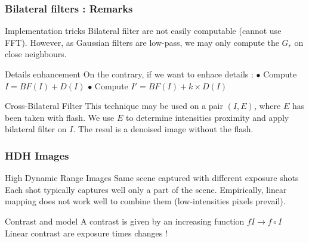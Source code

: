 \documentclass[pdf]{beamer}
\begin{document}
\begin{frame}
\frametitle{Bilateral filters : Remarks}


\begin{exampleblock}{Implementation tricks}
Bilateral filter are not easily computable (cannot use FFT).\newline
However, as Gaussian filters are low-pass, we may only compute the $G_r$ on close neighbours. 
\end{exampleblock}

\begin{exampleblock}{Details enhancement}
On the contrary, if we want to enhace details : \newline
$\bullet$ Compute $I = BF(I)+D(I)$ \newline
$\bullet$ Compute $I' = BF(I)+k \times D(I)$ \newline
\end{exampleblock}

\begin{exampleblock}{Cross-Bilateral Filter}
This technique may be used on a pair $(I,E)$, where $E$ has been taken with flash.\newline
We use $E$ to determine intensities proximity and apply bilateral filter on $I$.\newline
The resul is a denoised image without the flash.
\end{exampleblock}

\end{frame}

\begin{frame}
\frametitle{HDH Images}

\begin{block}{High Dynamic Range Images}
Same scene captured with different exposure shots\newline
Each shot typically captures well only a part of the scene. \newline
Empirically, linear mapping does not work well to combine them (low-intensities pixels prevail). \newline
\end{block}

\begin{exampleblock}{Contrast and model}
A contrast is given by an increasing function $f I \rightarrow  f \circ I$ \newline
Linear contrast are exposure times changes ! \newline
\end{exampleblock}

\end{frame}
\end{document}
